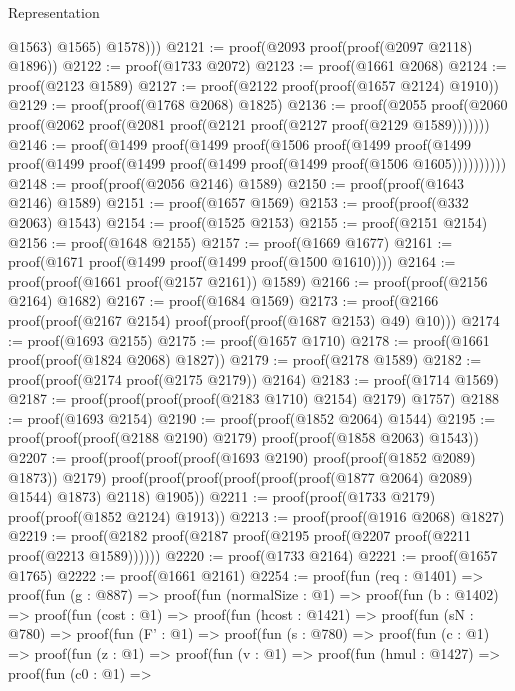 \begin{lexlean}{Representation}
\begin{coremodule}
                  @1563)
                @1565)
              @1578)))
@2121 := proof(@2093 proof(proof(@2097 @2118) @1896))
@2122 := proof(@1733 @2072)
@2123 := proof(@1661 @2068)
@2124 := proof(@2123 @1589)
@2127 := proof(@2122 proof(proof(@1657 @2124) @1910))
@2129 := proof(proof(@1768 @2068) @1825)
@2136 := proof(@2055
      proof(@2060 proof(@2062 proof(@2081 proof(@2121 proof(@2127 proof(@2129 @1589)))))))
@2146 := proof(@1499
      proof(@1499
          proof(@1506
              proof(@1499
                  proof(@1499
                      proof(@1499 proof(@1499 proof(@1499 proof(@1499 proof(@1506 @1605))))))))))
@2148 := proof(proof(@2056 @2146) @1589)
@2150 := proof(proof(@1643 @2146) @1589)
@2151 := proof(@1657 @1569)
@2153 := proof(proof(@332 @2063) @1543)
@2154 := proof(@1525 @2153)
@2155 := proof(@2151 @2154)
@2156 := proof(@1648 @2155)
@2157 := proof(@1669 @1677)
@2161 := proof(@1671 proof(@1499 proof(@1499 proof(@1500 @1610))))
@2164 := proof(proof(@1661 proof(@2157 @2161)) @1589)
@2166 := proof(proof(@2156 @2164) @1682)
@2167 := proof(@1684 @1569)
@2173 := proof(@2166 proof(proof(@2167 @2154) proof(proof(proof(@1687 @2153) @49) @10)))
@2174 := proof(@1693 @2155)
@2175 := proof(@1657 @1710)
@2178 := proof(@1661 proof(proof(@1824 @2068) @1827))
@2179 := proof(@2178 @1589)
@2182 := proof(proof(@2174 proof(@2175 @2179)) @2164)
@2183 := proof(@1714 @1569)
@2187 := proof(proof(proof(proof(@2183 @1710) @2154) @2179) @1757)
@2188 := proof(@1693 @2154)
@2190 := proof(proof(@1852 @2064) @1544)
@2195 := proof(proof(proof(@2188 @2190) @2179) proof(proof(@1858 @2063) @1543))
@2207 := proof(proof(proof(proof(@1693 @2190) proof(proof(@1852 @2089) @1873)) @2179)
      proof(proof(proof(proof(proof(proof(@1877 @2064) @2089) @1544) @1873) @2118) @1905))
@2211 := proof(proof(@1733 @2179) proof(proof(@1852 @2124) @1913))
@2213 := proof(proof(@1916 @2068) @1827)
@2219 := proof(@2182 proof(@2187 proof(@2195 proof(@2207 proof(@2211 proof(@2213 @1589))))))
@2220 := proof(@1733 @2164)
@2221 := proof(@1657 @1765)
@2222 := proof(@1661 @2161)
@2254 := proof(fun (req : @1401) =>
    proof(fun (g : @887) =>
      proof(fun (normalSize : @1) =>
        proof(fun (b : @1402) =>
          proof(fun (cost : @1) =>
            proof(fun (hcost : @1421) =>
              proof(fun (sN : @780) =>
                proof(fun (F' : @1) =>
                  proof(fun (s : @780) =>
                    proof(fun (c : @1) =>
                      proof(fun (z : @1) =>
                        proof(fun (v : @1) =>
                          proof(fun (hmul : @1427) =>
                            proof(fun (c0 : @1) =>

\end{coremodule}
\end{lexlean}

